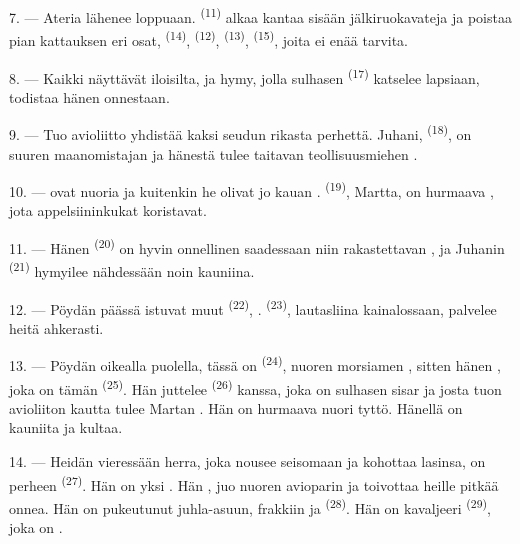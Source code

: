 7. --- Ateria lähenee loppuaan.  \textsuperscript{(11)} alkaa
kantaa sisään jälkiruokavateja ja poistaa pian kattauksen eri osat,
 \textsuperscript{(14)}, 
\textsuperscript{(12)},  \textsuperscript{(13)},  \textsuperscript{(15)}, joita ei enää tarvita.

\VUsaut{3.0mm}

8. --- Kaikki näyttävät iloisilta, ja hymy, jolla sulhasen 
\textsuperscript{(17)} katselee lapsiaan, todistaa hänen onnestaan.

9. --- Tuo avioliitto yhdistää kaksi seudun rikasta perhettä. Juhani,
 \textsuperscript{(18)}, on suuren maanomistajan
 ja hänestä tulee taitavan teollisuusmiehen .

10. ---  ovat nuoria ja kuitenkin he olivat jo kauan
.  \textsuperscript{(19)}, Martta, on
hurmaava , jota appelsiininkukat koristavat.

11. --- Hänen  \textsuperscript{(20)} on hyvin onnellinen
saadessaan niin rakastettavan , ja Juhanin 
\textsuperscript{(21)} hymyilee nähdessään  noin kauniina.

12. --- Pöydän päässä istuvat muut  \textsuperscript{(22)},
. 
\textsuperscript{(23)}, lautasliina kainalossaan, palvelee heitä ahkerasti.

\VUsaut{3.0mm}

13. --- Pöydän oikealla puolella, tässä on 
\textsuperscript{(24)}, nuoren morsiamen , sitten hänen
, joka on tämän  \textsuperscript{(25)}.
Hän juttelee  \textsuperscript{(26)} kanssa, joka on
sulhasen sisar ja josta tuon avioliiton kautta tulee Martan . Hän
on hurmaava nuori tyttö. Hänellä on kauniita  ja
 kultaa.

14. --- Heidän vieressään herra, joka nousee seisomaan ja kohottaa lasinsa, on
perheen  \textsuperscript{(27)}. Hän on yksi . Hän , juo nuoren avioparin
 ja toivottaa heille pitkää onnea. Hän on pukeutunut
juhla-asuun, frakkiin ja  \textsuperscript{(28)}. Hän on
kavaljeeri  \textsuperscript{(29)}, joka on .

